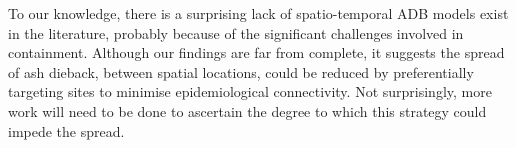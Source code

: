 






To our knowledge, there is a surprising lack of spatio-temporal ADB models exist in the literature, probably because of the significant challenges involved in containment. Although our findings are far from complete, it suggests the spread of ash dieback, between spatial locations, could be reduced by preferentially targeting sites to minimise epidemiological connectivity. Not surprisingly, more work will need to be done to ascertain the degree to which this strategy could impede the spread. 



